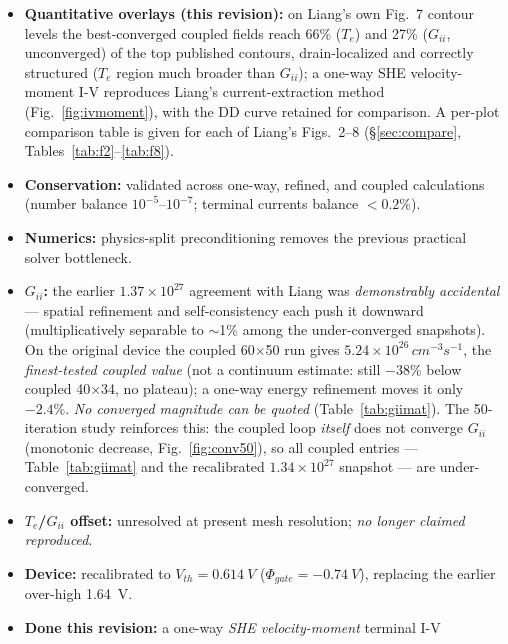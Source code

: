 \documentclass[11pt]{article}
\begin{document}
\begin{itemize}[leftmargin=1.4em,itemsep=2pt]
(not the \SI{2}{mV} criterion) and that $G_{ii}$ \emph{does not converge in the loop} (monotonic
decrease, no plateau); $n$ and $|v|$ are stable while $T_e$ drifts down slowly. The
previously-quoted $-37\%$ feedback fraction is \emph{superseded} --- the suppression is $\ge-53\%$
and still growing.
\item \textbf{Quantitative overlays (this revision):} on Liang's own Fig.~7 contour levels the
best-converged coupled fields reach 66\% ($T_e$) and 27\% ($G_{ii}$, unconverged) of the top
published contours, drain-localized and correctly structured ($T_e$ region much broader than
$G_{ii}$); a one-way SHE velocity-moment I-V reproduces Liang's current-extraction method
(Fig.~\ref{fig:ivmoment}), with the DD curve retained for comparison. A per-plot comparison table is
given for each of Liang's Figs.~2--8 (\S\ref{sec:compare}, Tables~\ref{tab:f2}--\ref{tab:f8}).
\item \textbf{Conservation:} validated across one-way, refined, and coupled calculations
(number balance $10^{-5}$--$10^{-7}$; terminal currents balance $<0.2\%$).
\item \textbf{Numerics:} physics-split preconditioning removes the previous practical solver
bottleneck.
\item \textbf{$G_{ii}$:} the earlier $1.37\times10^{27}$ agreement with Liang was
\emph{demonstrably accidental} --- spatial refinement and self-consistency each push it downward
(multiplicatively separable to $\sim$1\% among the under-converged snapshots). On the original
device the coupled 60$\times$50 run
gives $5.24\times10^{26}\,\si{cm^{-3}s^{-1}}$, the \emph{finest-tested coupled value} (not a
continuum estimate: still $-38\%$ below coupled 40$\times$34, no plateau); a one-way energy
refinement moves it only $-2.4\%$. \emph{No converged magnitude can be quoted}
(Table~\ref{tab:giimat}). The 50-iteration study reinforces this: the coupled loop \emph{itself}
does not converge $G_{ii}$ (monotonic decrease, Fig.~\ref{fig:conv50}), so all coupled entries ---
Table~\ref{tab:giimat} and the recalibrated $1.34\times10^{27}$ snapshot --- are under-converged.
\item \textbf{$T_e$/$G_{ii}$ offset:} unresolved at present mesh resolution; \emph{no longer
claimed reproduced}.
\item \textbf{Device:} recalibrated to $V_{th}=\SI{0.614}{V}$ ($\Phi_{gate}=\SI{-0.74}{V}$),
replacing the earlier over-high \SI{1.64}{V}.
\item \textbf{Done this revision:} a one-way \emph{SHE velocity-moment} terminal I-V

\end{itemize}
\end{document}
